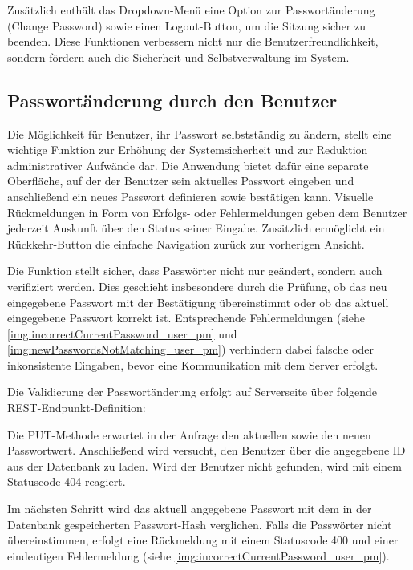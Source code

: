 Zusätzlich enthält das Dropdown-Menü eine Option zur Passwortänderung (\glqq Change Password\grqq{}) sowie einen Logout-Button, um die Sitzung sicher zu beenden. Diese Funktionen verbessern nicht nur die Benutzerfreundlichkeit, sondern fördern auch die Sicherheit und Selbstverwaltung im System.

\subsection*{Passwortänderung durch den Benutzer}
Die Möglichkeit für Benutzer, ihr Passwort selbstständig zu ändern, stellt eine wichtige Funktion zur Erhöhung der Systemsicherheit und zur Reduktion administrativer Aufwände dar. Die Anwendung bietet dafür eine separate Oberfläche, auf der der Benutzer sein aktuelles Passwort eingeben und anschließend ein neues Passwort definieren sowie bestätigen kann. Visuelle Rückmeldungen in Form von Erfolgs- oder Fehlermeldungen geben dem Benutzer jederzeit Auskunft über den Status seiner Eingabe. Zusätzlich ermöglicht ein Rückkehr-Button die einfache Navigation zurück zur vorherigen Ansicht.


Die Funktion stellt sicher, dass Passwörter nicht nur geändert, sondern auch verifiziert werden. Dies geschieht insbesondere durch die Prüfung, ob das neu eingegebene Passwort mit der Bestätigung übereinstimmt oder ob das aktuell eingegebene Passwort korrekt ist. Entsprechende Fehlermeldungen (siehe \autoref{img:incorrectCurrentPassword_user_pm} und \autoref{img:newPasswordsNotMatching_user_pm}) verhindern dabei falsche oder inkonsistente Eingaben, bevor eine Kommunikation mit dem Server erfolgt.

Die Validierung der Passwortänderung erfolgt auf Serverseite über folgende REST-Endpunkt-Definition:


Die PUT-Methode erwartet in der Anfrage den aktuellen sowie den neuen Passwortwert. Anschließend wird versucht, den Benutzer über die angegebene ID aus der Datenbank zu laden. Wird der Benutzer nicht gefunden, wird mit einem Statuscode 404 reagiert.

Im nächsten Schritt wird das aktuell angegebene Passwort mit dem in der Datenbank gespeicherten Passwort-Hash verglichen. Falls die Passwörter nicht übereinstimmen, erfolgt eine Rückmeldung mit einem Statuscode 400 und einer eindeutigen Fehlermeldung (siehe \autoref{img:incorrectCurrentPassword_user_pm}).

